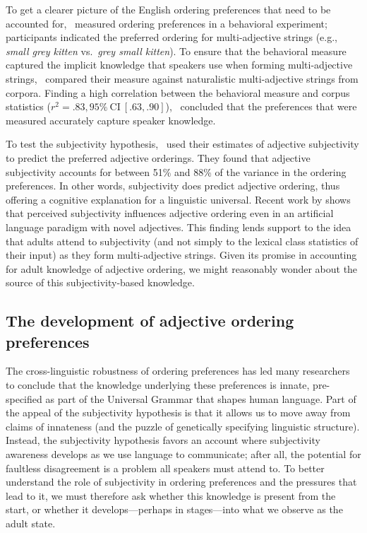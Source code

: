 \documentclass[10pt]{article}
\newcommand{\gcs}[1]{\textcolor{blue}{[gcs: #1]}}
\begin{document}
To get a clearer picture of the English ordering preferences that need to be accounted for, \citeauthor{scontras2017subjectivity}~measured ordering preferences in a behavioral experiment; participants indicated the preferred ordering for multi-adjective strings (e.g., \textit{small grey kitten} vs.~\textit{grey small kitten}). To ensure that the behavioral measure captured the implicit knowledge that speakers use when forming multi-adjective strings, \citeauthor{scontras2017subjectivity}~compared their measure against naturalistic multi-adjective strings from corpora. Finding a high correlation between the behavioral measure and corpus statistics ($r^2 = .83, 95\%\ \textrm{CI}\ [.63, .90]$), \citeauthor{scontras2017subjectivity}~concluded that the preferences that were measured accurately capture speaker knowledge.

To test the subjectivity hypothesis, \citeauthor{scontras2017subjectivity}~used their estimates of adjective subjectivity to predict the preferred adjective orderings. They found that adjective subjectivity accounts for between 51\% and 88\% of the variance in the ordering preferences. In other words, subjectivity does predict adjective ordering, thus offering a cognitive explanation for a linguistic universal. Recent work by \cite{hahnetal2017} %
shows that perceived subjectivity influences adjective ordering even in an artificial language paradigm with novel adjectives. This finding lends support to the idea that adults attend to subjectivity (and not simply to the lexical class statistics of their input) as they form multi-adjective strings. Given its promise in accounting for adult knowledge of adjective ordering, we might reasonably wonder about the source of this subjectivity-based knowledge. 

\subsection{The development of adjective ordering preferences}
The cross-linguistic robustness of ordering preferences has led many researchers to conclude that the knowledge underlying these preferences is innate, pre-specified as part of the Universal Grammar that shapes human language. Part of the appeal of the subjectivity hypothesis is that it allows us to move away from claims of innateness (and the puzzle of genetically specifying linguistic structure). Instead, the subjectivity hypothesis favors  an account where subjectivity awareness develops as we use language to communicate; after all, the potential for faultless disagreement is a problem all speakers must attend to. To better understand the role of subjectivity in ordering preferences and the pressures that lead to it, we must therefore ask whether this knowledge is present from the start, or whether it develops---perhaps in stages---into what we observe as the adult state. 
\end{document}
